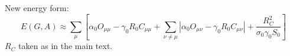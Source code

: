 \documentclass[12pt, titlepage]{report}
\begin{document}
New energy form:
\begin{equation}
E(G,A) \approx \sum_\mu \left[\alpha_0 O_{\mu \mu}-\gamma_0 R_0 C_{\mu\mu}+\sum_{\nu\neq \mu}\left|\alpha_0 O_{\mu\nu}-\gamma_0 R_0 C_{\mu\nu}\right|+\frac{R_C^2}{\sigma_0 \gamma_0 S_0}\right]
\end{equation}
$R_C$ taken as in the main text.
\end{document}
